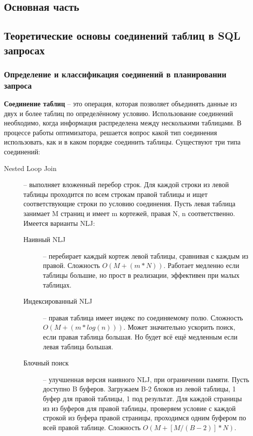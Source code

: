 \documentclass[12pt]{article}
\begin{document}
\begin{flushleft}
\centering \section*{Основная часть}
\centering \subsection*{Теоретические основы соединений таблиц в SQL запросах}
\centering \subsubsection*{Определение и классификация соединений в планировании запроса}
\raggedright
\textbf{Соединение таблиц} -- это операция, которая позволяет объединять данные
из двух и более таблиц по определённому условию. Использование соединений необходимо,
когда информация распределена между несколькими таблицами. В процессе работы оптимизатора,
решается вопрос какой тип соединения использовать, как и в каком порядке соединить таблицы. 
Существуют три типа соединений:
\begin{description}
    \item[Nested Loop Join] -- выполняет вложенный перебор строк. 
    Для каждой строки из левой таблицы проходится по всем строкам правой таблицы 
    и ищет соответствующие строки по условию соединения. Пусть левая таблица 
    занимает M страниц и имеет m кортежей, правая N, n соответственно. Имеется 
    варианты NLJ:
    \begin{description}
        \item[Наивный NLJ] -- перебирает каждый кортеж левой таблицы, 
        сравнивая с каждым из правой. Сложность $O(M+(m*N))$. Работает медленно 
        если таблицы большие, но прост в реализации, эффективен при малых 
        таблицах.
        \item[Индексированный NLJ] -- правая таблица имеет индекс по соединяемому 
        полю. Сложность $O(M+(m*log(n)))$. Может значительно ускорить поиск, если 
        правая таблица большая. Но будет всё ещё медленным если левая таблица 
        большая.
        \item[Блочный поиск] -- улучшенная версия наивного NLJ, при
        ограничении памяти. Пусть доступно B буферов. Загружаем B-2 
        блоков из левой таблицы, 1 буфер для правой таблицы, 1 под результат. 
        Для каждой страницы из из буферов для правой таблицы, проверяем условие 
        с каждой строкой из буфера правой страницы, проходимся одним буфером по 
        всей правой таблице. Сложность $O(M + [M/(B-2)] * N)$.

\end{description}
\end{description}
\end{flushleft}
\end{document}
